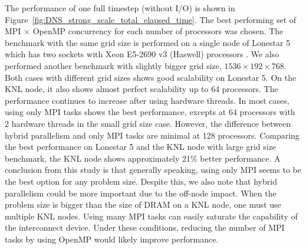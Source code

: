 The performance of one full timestep (without I/O) is shown in
Figure~\ref{fig:DNS_strong_scale_total_elapsed_time}. The best performing set
of MPI $\times$ OpenMP concurrency for each number of processors was chosen.
The benchmark with the same grid size is performed on a single node of
Lonestar 5 which has two sockets with Xeon E5-2690 v3 (Haswell) processors .
We also performed another benchmark with slightly bigger grid size,
$1536 \times 192 \times 768$. Both cases with different grid sizes shows good
scalability on Lonestar 5. On the KNL node, it also shows almost perfect
scalability up to 64 processors. The performance continues to increase after
using hardware threads. In most cases, using only MPI tasks shows the best
performance, excepts at 64 processors with 2 hardware threads in the small grid
size case. However, the difference between hybrid parallelism and only MPI
tasks are minimal at 128 processors. Comparing the best performance on Lonestar
5 and the KNL node with large grid size benchmark, the KNL node shows
approximately 21\% better performance. A conclusion from this study is that
generally speaking, using only MPI seems to be the best option for any problem
size.  Despite this, we also note that hybrid parallelism could be more
important due to the off-node impact. When the problem size is bigger than the
size of DRAM on a KNL node, one must use multiple KNL nodes. Using many MPI
tasks can easily saturate the capability of the interconnect device. Under
these conditions, reducing the number of MPI tasks by using OpenMP would likely
improve performance.

